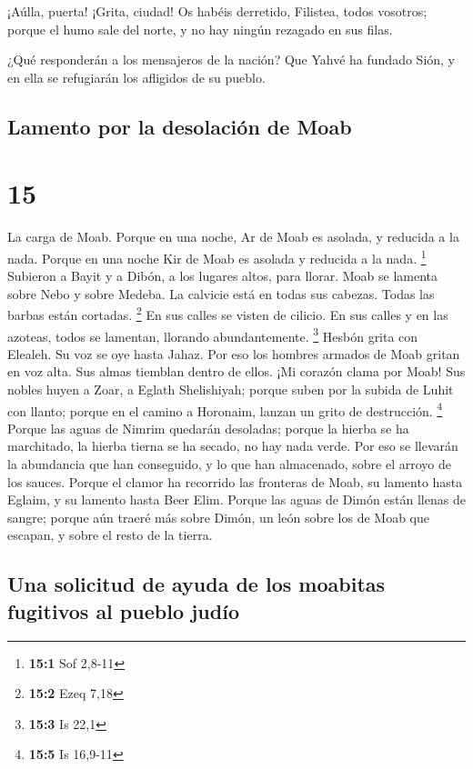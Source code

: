  ¡Aúlla, puerta! ¡Grita, ciudad! Os habéis derretido,
Filistea, todos vosotros; porque el humo sale del norte, y no hay ningún
rezagado en sus filas.

 ¿Qué responderán a los mensajeros de la nación? Que
Yahvé ha fundado Sión, y en ella se refugiarán los afligidos de su
pueblo.

\hypertarget{lamento-por-la-desolaciuxf3n-de-moab}{%
\subsection{Lamento por la desolación de
Moab}\label{lamento-por-la-desolaciuxf3n-de-moab}}

\hypertarget{section-14}{%
\section{15}\label{section-14}}

 La carga de Moab. Porque en una noche, Ar de Moab es
asolada, y reducida a la nada. Porque en una noche Kir de Moab es
asolada y reducida a la nada. \footnote{\textbf{15:1} Sof 2,8-11}
 Subieron a Bayit y a Dibón, a los lugares altos, para
llorar. Moab se lamenta sobre Nebo y sobre Medeba. La calvicie está en
todas sus cabezas. Todas las barbas están cortadas. \footnote{\textbf{15:2}
  Ezeq 7,18}  En sus calles se visten de cilicio. En sus
calles y en las azoteas, todos se lamentan, llorando abundantemente.
\footnote{\textbf{15:3} Is 22,1}  Hesbón grita con
Elealeh. Su voz se oye hasta Jahaz. Por eso los hombres armados de Moab
gritan en voz alta. Sus almas tiemblan dentro de ellos. 
¡Mi corazón clama por Moab! Sus nobles huyen a Zoar, a Eglath
Shelishiyah; porque suben por la subida de Luhit con llanto; porque en
el camino a Horonaim, lanzan un grito de destrucción. \footnote{\textbf{15:5}
  Is 16,9-11}  Porque las aguas de Nimrim quedarán
desoladas; porque la hierba se ha marchitado, la hierba tierna se ha
secado, no hay nada verde.  Por eso se llevarán la
abundancia que han conseguido, y lo que han almacenado, sobre el arroyo
de los sauces.  Porque el clamor ha recorrido las
fronteras de Moab, su lamento hasta Eglaim, y su lamento hasta Beer
Elim.  Porque las aguas de Dimón están llenas de sangre;
porque aún traeré más sobre Dimón, un león sobre los de Moab que
escapan, y sobre el resto de la tierra.

\hypertarget{una-solicitud-de-ayuda-de-los-moabitas-fugitivos-al-pueblo-juduxedo}{%
\subsection{Una solicitud de ayuda de los moabitas fugitivos al pueblo
judío}\label{una-solicitud-de-ayuda-de-los-moabitas-fugitivos-al-pueblo-juduxedo}}

